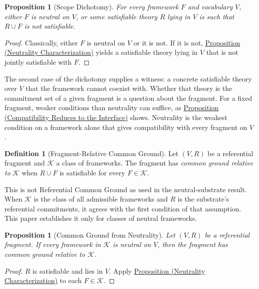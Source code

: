 \documentclass[11pt]{article}
\theoremstyle{plain}
\newtheorem{proposition}[theorem]{Proposition}
\theoremstyle{definition}
\newtheorem{definition}[theorem]{Definition}
\theoremstyle{remark}
\newcommand{\PropRef}[2]{\hyperref[#1]{Proposition (#2)}}
\newcommand{\Framework}{F}
\begin{document}
\begin{proposition}[Scope Dichotomy]
  \label{se110.proposition.Dichotomy}
  For every framework $\Framework$ and vocabulary $V$, either $\Framework$ is
  neutral on $V$, or some satisfiable theory $R$ lying in $V$ is such that
  $R \cup \Framework$ is not satisfiable.
\end{proposition}

\begin{proof}
  Classically, either $\Framework$ is neutral on $V$ or it is not.
  If it is not, \PropRef{se110.proposition.NeutralOnIffCompatible}{Neutrality
    Characterization} yields a satisfiable theory lying in $V$ that is not
  jointly satisfiable with $\Framework$.
\end{proof}

The second case of the dichotomy supplies a witness: a concrete satisfiable
theory over $V$ that the framework cannot coexist with.
Whether that theory is the commitment set of a given fragment is a question
about the fragment.
For a fixed fragment, weaker conditions than neutrality can suffice, as
\PropRef{se110.proposition.SatisfiableUnionIffPermits}{Compatibility Reduces
  to the Interface} shows.
Neutrality is the weakest condition on a framework alone that gives
compatibility with every fragment on $V$.

\begin{definition}[Fragment-Relative Common Ground]
  \label{se110.def.FragmentCommonGround}
  Let $(V,R)$ be a referential fragment and $\mathcal{K}$ a class of frameworks.
  The fragment has \emph{common ground relative to} $\mathcal{K}$ when
  $R \cup \Framework$ is satisfiable for every $\Framework \in \mathcal{K}$.
\end{definition}

This is not Referential Common Ground as used in the neutral-substrate result.
When $\mathcal{K}$ is the class of all admissible frameworks and $R$ is the
substrate's referential commitments, it agrees with the first condition of that
assumption.
This paper establishes it only for classes of neutral frameworks.

\begin{proposition}[Common Ground from Neutrality]
  \label{se110.proposition.FragmentCommonGroundOfNeutral}
  Let $(V,R)$ be a referential fragment.
  If every framework in $\mathcal{K}$ is neutral on $V$, then the fragment has
  common ground relative to $\mathcal{K}$.
\end{proposition}

\begin{proof}
  $R$ is satisfiable and lies in $V$.
  Apply \PropRef{se110.proposition.NeutralOnIffCompatible}{Neutrality
    Characterization} to each $\Framework \in \mathcal{K}$.
\end{proof}
\end{document}
